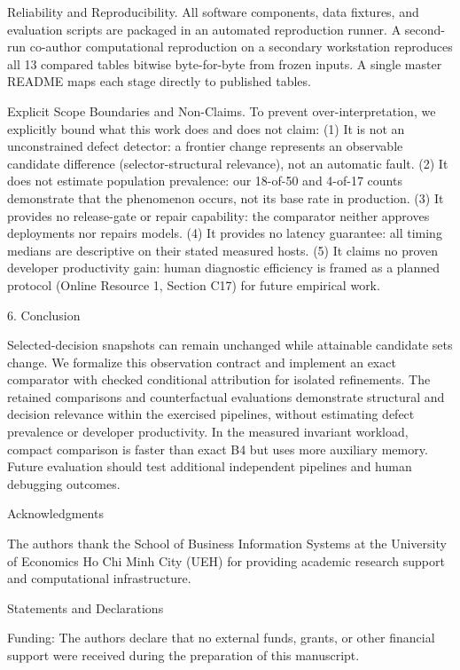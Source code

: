 \documentclass[11pt,a4paper]{article}
\begin{document}
Reliability and Reproducibility. All software components, data fixtures, and evaluation scripts are packaged in an automated reproduction runner. A second-run co-author computational reproduction on a secondary workstation reproduces all 13 compared tables bitwise byte-for-byte from frozen inputs. A single master README maps each stage directly to published tables.



Explicit Scope Boundaries and Non-Claims. To prevent over-interpretation, we explicitly bound what this work does and does not claim: (1) It is not an unconstrained defect detector: a frontier change represents an observable candidate difference (selector-structural relevance), not an automatic fault. (2) It does not estimate population prevalence: our 18-of-50 and 4-of-17 counts demonstrate that the phenomenon occurs, not its base rate in production. (3) It provides no release-gate or repair capability: the comparator neither approves deployments nor repairs models. (4) It provides no latency guarantee: all timing medians are descriptive on their stated measured hosts. (5) It claims no proven developer productivity gain: human diagnostic efficiency is framed as a planned protocol (Online Resource 1, Section C17) for future empirical work.

6. Conclusion

Selected-decision snapshots can remain unchanged while attainable candidate sets change. We formalize this observation contract and implement an exact comparator with checked conditional attribution for isolated refinements. The retained comparisons and counterfactual evaluations demonstrate structural and decision relevance within the exercised pipelines, without estimating defect prevalence or developer productivity. In the measured invariant workload, compact comparison is faster than exact B4 but uses more auxiliary memory. Future evaluation should test additional independent pipelines and human debugging outcomes.

Acknowledgments

The authors thank the School of Business Information Systems at the University of Economics Ho Chi Minh City (UEH) for providing academic research support and computational infrastructure.



Statements and Declarations



Funding: The authors declare that no external funds, grants, or other financial support were received during the preparation of this manuscript.
\end{document}
